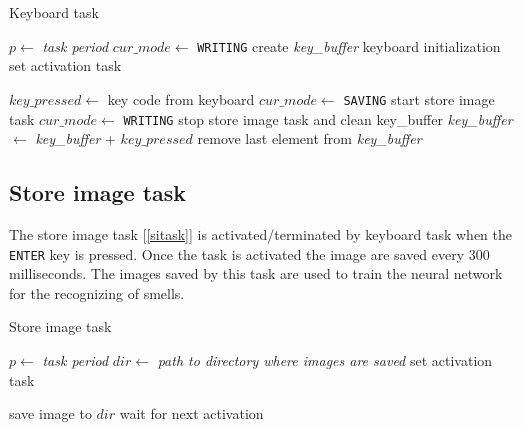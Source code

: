 \documentclass[12pt]{article}
\begin{document}
\begin{algorithm}[H]
\caption{Keyboard task}
\label{ktask}

\begin{algorithmic}
\State $p\gets$ \textit{task period}
\State $cur\_mode\gets$ \texttt{WRITING}
\State create \textit{key\_buffer}
\State keyboard initialization
\State set activation task

\Repeat
\State $key\_pressed\gets$ key code from keyboard
    \State $cur\_mode\gets$ \texttt{SAVING}
    \State start store image task
    \Else
    \State $cur\_mode\gets$ \texttt{WRITING}
    \State stop store image task and clean key\_buffer
    \EndIf
{}
        \State \textit{key\_buffer} $\gets$ \textit{key\_buffer} + $key\_pressed$ 
        \State remove last element from \textit{key\_buffer}
    \EndIf
\EndIf


\end{algorithmic}
\end{algorithm}

\subsection{Store image task}
The store image task [\ref{sitask}] is activated/terminated by keyboard task
when the \texttt{ENTER} key is pressed. Once the task is activated the image
are saved every $300$ milliseconds. The images saved by this task are used to
train the neural network for the recognizing of smells.

\begin{algorithm}[H]
\caption{Store image task}
\label{sitask}

\begin{algorithmic}
\State $p\gets$ \textit{task period}
\State $dir\gets$ \textit{path to directory where images are saved}
\State set activation task

\Loop
\State save image to $dir$
\State wait for next activation
\EndLoop

\end{algorithmic}
\end{algorithm}
\end{document}
